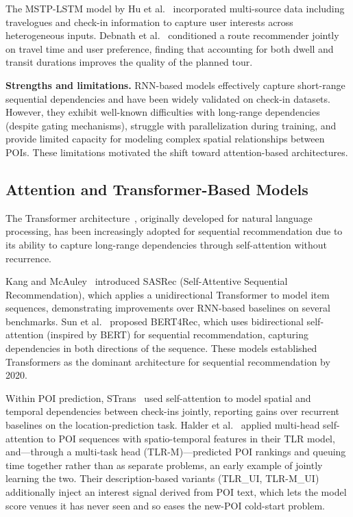 The MSTP-LSTM model by Hu et al.~\cite{hu2018mstp} incorporated multi-source data including travelogues and check-in information to capture user interests across heterogeneous inputs. Debnath et al.~\cite{debnath2019pttr} conditioned a route recommender jointly on travel time and user preference, finding that accounting for both dwell and transit durations improves the quality of the planned tour.

\textbf{Strengths and limitations.} RNN-based models effectively capture short-range sequential dependencies and have been widely validated on check-in datasets. However, they exhibit well-known difficulties with long-range dependencies (despite gating mechanisms), struggle with parallelization during training, and provide limited capacity for modeling complex spatial relationships between POIs. These limitations motivated the shift toward attention-based architectures.

\subsection{Attention and Transformer-Based Models}
\label{sec:sota-dl-transformer}

The Transformer architecture~\cite{vaswani2017attention}, originally developed for natural language processing, has been increasingly adopted for sequential recommendation due to its ability to capture long-range dependencies through self-attention without recurrence.

Kang and McAuley~\cite{kang2018sasrec} introduced SASRec (Self-Attentive Sequential Recommendation), which applies a unidirectional Transformer to model item sequences, demonstrating improvements over RNN-based baselines on several benchmarks. Sun et al.~\cite{sun2019bert4rec} proposed BERT4Rec, which uses bidirectional self-attention (inspired by BERT) for sequential recommendation, capturing dependencies in both directions of the sequence. These models established Transformers as the dominant architecture for sequential recommendation by 2020.

Within POI prediction, STrans~\cite{lian2020strans} used self-attention to model spatial and temporal dependencies between check-ins jointly, reporting gains over recurrent baselines on the location-prediction task. Halder et al.~\cite{halder2022tlr} applied multi-head self-attention to POI sequences with spatio-temporal features in their TLR model, and---through a multi-task head (TLR-M)---predicted POI rankings and queuing time together rather than as separate problems, an early example of jointly learning the two. Their description-based variants (TLR\_UI, TLR-M\_UI) additionally inject an interest signal derived from POI text, which lets the model score venues it has never seen and so eases the new-POI cold-start problem.

